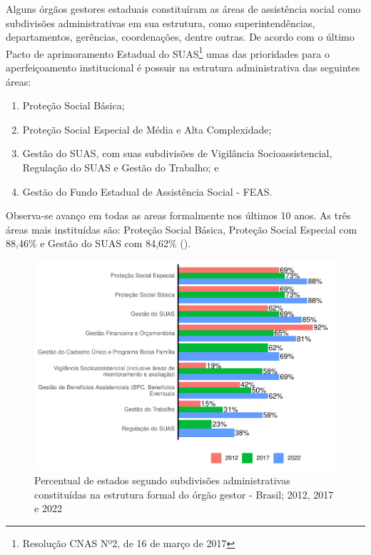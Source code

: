 \documentclass[
  brazilian]{report}
\providecommand{\tightlist}{%
  \setlength{\itemsep}{0pt}\setlength{\parskip}{0pt}}
\begin{document}
Alguns órgãos gestores estaduais constituíram as áreas de assistência
social como subdivisões administrativas em sua estrutura, como
superintendências, departamentos, gerências, coordenações, dentre
outras. De acordo com o último Pacto de aprimoramento Estadual do
SUAS\footnote{Resolução CNAS Nº2, de 16 de março de 2017} umas das
prioridades para o aperfeiçoamento institucional é possuir na estrutura
administrativa das seguintes áreas:

\begin{enumerate}
\def\labelenumi{\arabic{enumi})}
\tightlist
\item
  Proteção Social Básica;
\item
  Proteção Social Especial de Média e Alta Complexidade;
\item
  Gestão do SUAS, com suas subdivisões de Vigilância Socioassistencial,
  Regulação do SUAS e Gestão do Trabalho; e
\item
  Gestão do Fundo Estadual de Assistência Social - FEAS.
\end{enumerate}

Observa-se avanço em todas as areas formalmente nos últimos 10 anos. As
três áreas mais instituídas são: Proteção Social Básica, Proteção Social
Especial com 88,46\% e Gestão do SUAS com 84,62\% ().

\begin{figure}
\includegraphics{Censo-SUAS-2022_files/figure-latex/uf_subd-1} \caption[Percentual de estados segundo subdivisões administrativas constituídas na estrutura formal do órgão gestor - Brasil]{Percentual de estados segundo subdivisões administrativas constituídas na estrutura formal do órgão gestor - Brasil; 2012, 2017 e 2022}\label{fig:uf_subd}
\end{figure}
\end{document}
